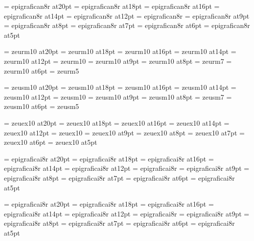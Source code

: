 
\font\twentyrm=     epigrafican8r at20pt
\font\eighteenrm=   epigrafican8r at18pt
\font\sixteenrm=    epigrafican8r at16pt
\font\fourteenrm=   epigrafican8r at14pt
\font\twelverm=     epigrafican8r at12pt
\font\tenrm=        epigrafican8r
\font\ninerm=       epigrafican8r at9pt
\font\eightrm=      epigrafican8r at8pt
\font\sevenrm=      epigrafican8r at7pt
\font\sixrm=        epigrafican8r at6pt
\font\fiverm=       epigrafican8r at5pt

\font\twentyi=      zeurm10 at20pt
\font\eighteeni=    zeurm10 at18pt
\font\sixteeni=     zeurm10 at16pt
\font\fourteeni=    zeurm10 at14pt
\font\twelvei=      zeurm10 at12pt
\font\teni=         zeurm10
\font\ninei=        zeurm10 at9pt
\font\eighti=       zeurm10 at8pt
\font\seveni=       zeurm7
\font\sixi=         zeurm10 at6pt
\font\fivei=        zeurm5

\font\twentysy=     zeusm10 at20pt
\font\eighteensy=   zeusm10 at18pt
\font\sixteensy=    zeusm10 at16pt
\font\fourteensy=   zeusm10 at14pt
\font\twelvesy=     zeusm10 at12pt
\font\tensy=        zeusm10
\font\ninesy=       zeusm10 at9pt
\font\eightsy=      zeusm10 at8pt
\font\sevensy=      zeusm7
\font\sixsy=        zeusm10 at6pt
\font\fivesy=       zeusm5

\font\twentyex=     zeuex10 at20pt
\font\eighteenex=   zeuex10 at18pt
\font\sixteenex=    zeuex10 at16pt
\font\fourteenex=   zeuex10 at14pt
\font\twelveex=     zeuex10 at12pt
\font\tenex=        zeuex10 
\font\nineex=       zeuex10 at9pt
\font\eightex=      zeuex10 at8pt
\font\sevenex=      zeuex10 at7pt
\font\sixex=        zeuex10 at6pt
\font\fiveex=       zeuex10 at5pt

\font\twentyit=     epigraficai8r at20pt
\font\eighteenit=   epigraficai8r at18pt
\font\sixteenit=    epigraficai8r at16pt
\font\fourteenit=   epigraficai8r at14pt
\font\twelveit=     epigraficai8r at12pt
\font\tenit=        epigraficai8r
\font\nineit=       epigraficai8r at9pt
\font\eightit=      epigraficai8r at8pt
\font\sevenit=      epigraficai8r at7pt
\font\sixit=        epigraficai8r at6pt
\font\fiveit=       epigraficai8r at5pt

\font\twentysl=     epigraficai8r at20pt
\font\eighteensl=   epigraficai8r at18pt
\font\sixteensl=    epigraficai8r at16pt
\font\fourteensl=   epigraficai8r at14pt
\font\twelvesl=     epigraficai8r at12pt
\font\tensl=        epigraficai8r
\font\ninesl=       epigraficai8r at9pt
\font\eightsl=      epigraficai8r at8pt
\font\sevensl=      epigraficai8r at7pt
\font\sixsl=        epigraficai8r at6pt
\font\fivesl=       epigraficai8r at5pt

